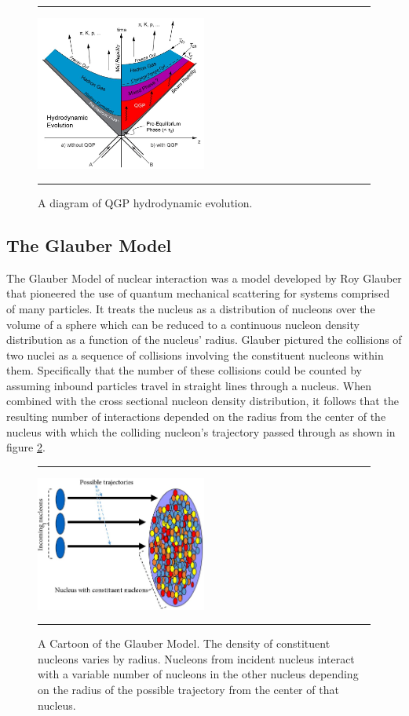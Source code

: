 \begin{figure}[b!]
  \centering
    \rule{35em}{0.5pt}
    \includegraphics[width=0.5\textwidth]{Figures/hydrodynamicevolution.JPG}

  \caption[A diagram of QGP hydrodynamic evolution.]{A diagram of QGP hydrodynamic evolution.}
  \label{fig:hydroevolution}
    \rule{35em}{0.5pt}
\end{figure}

\subsection{The Glauber Model}
The Glauber Model of nuclear interaction was a model developed by Roy Glauber that pioneered the use of quantum mechanical scattering for systems comprised of many particles. It treats the nucleus as a distribution of nucleons over the volume of a sphere which can be reduced to a continuous nucleon density distribution as a function of the nucleus' radius\citep{Miller:2007ri}. Glauber pictured the collisions of two nuclei as a sequence of collisions involving the constituent nucleons within them. Specifically that the number of these collisions could be counted by assuming inbound particles travel in straight lines through a nucleus. When combined with the cross sectional nucleon density distribution, it follows that the resulting number of interactions depended on the radius from the center of the nucleus with which the colliding nucleon's trajectory passed through as shown in figure \ref{fig:glaubermodel}.
\begin{figure}[b!]
  \centering
    \rule{35em}{0.5pt}
    \includegraphics[width=0.5\textwidth]{Figures/glauberpic.jpg}

  \caption[A Cartoon of the Glauber Model]{A Cartoon of the Glauber Model. The density of constituent nucleons varies by radius. Nucleons from incident nucleus interact with a variable number of nucleons in the other nucleus depending on the radius of the possible trajectory from the center of that nucleus. \citep{Nagle:2006}}
  \label{fig:glaubermodel}
    \rule{35em}{0.5pt}
\end{figure}


